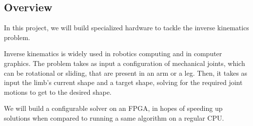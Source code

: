 \subsection*{Overview}

In this project, we will build specialized hardware to tackle the inverse kinematics problem.

Inverse kinematics is widely used in robotics computing and in computer graphics. The problem takes as input a configuration of mechanical joints, which can be rotational or sliding, that are present in an arm or a leg. Then, it takes as input the limb's current shape and a target shape, solving for the required joint motions to get to the desired shape.

We will build a configurable solver on an FPGA, in hopes of speeding up solutions when compared to running a same algorithm on a regular CPU.